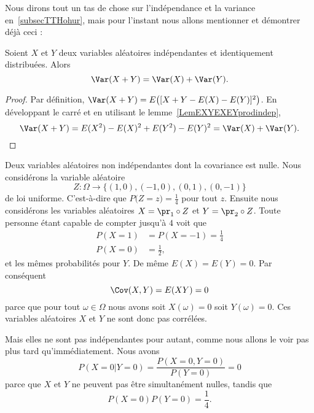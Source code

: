 Nous dirons tout un tas de chose sur l'indépendance et la variance en~\ref{subsecTTHohur}, mais pour l'instant nous allons mentionner et démontrer déjà ceci :
\begin{lemma}   \label{LemVarXpYsmindep}
	Soient \( X\) et \( Y\) deux variables aléatoires indépendantes et identiquement distribuées. Alors
	\begin{equation}
		\Var(X+Y)=\Var(X)+\Var(Y).
	\end{equation}
\end{lemma}

\begin{proof}
	Par définition, \( \Var(X+Y)=E\big( [X+Y-E(X)-E(Y)]^2 \big)\). En développant le carré et en utilisant le lemme~\ref{LemEXYEXEYprodindep},
	\begin{equation}
		\Var(X+Y)=E(X^2)-E(X)^2+E(Y^2)-E(Y)^2=\Var(X)+\Var(Y).
	\end{equation}
\end{proof}

\begin{example} \label{ExWLzkuWd}
	Deux variables aléatoires non indépendantes dont la covariance est nulle. Nous considérons la variable aléatoire
	\begin{equation}
		Z\colon \Omega\to \{ (1,0),(-1,0),(0,1),(0,-1) \}
	\end{equation}
	de loi uniforme. C'est-à-dire que \(  P\big( Z=z \big)=\frac{1}{ 4 }  \) pour tout \( z\). Ensuite nous considérons les variables aléatoires \( X=\pr_1\circ Z\) et \( Y=\pr_2\circ Z\). Toute personne étant capable de compter jusqu'à \( 4\) voit que
	\begin{subequations}
		\begin{align}
			P(X=1) & =P(X=-1)=\frac{1}{ 4 } \\
			P(X=0) & =\frac{ 1 }{2},
		\end{align}
	\end{subequations}
	et les mêmes probabilités pour \( Y\). De même \( E(X)=E(Y)=0\). Par conséquent
	\begin{equation}
		\Cov(X,Y)=E(XY)=0
	\end{equation}
	parce que pour tout \( \omega\in \Omega\) nous avons soit \( X(\omega)=0\) soit \( Y(\omega)=0\). Ces variables aléatoires \( X\) et \( Y\) ne sont donc pas corrélées.

	Mais elles ne sont pas indépendantes pour autant, comme nous allons le voir pas plus tard qu'immédiatement. Nous avons
	\begin{equation}
		P(X=0|Y=0)=\frac{ P(X=0,Y=0) }{ P(Y=0) }=0
	\end{equation}
	parce que \( X\) et \( Y\) ne peuvent pas être simultanément nulles, tandis que
	\begin{equation}
		P(X=0)P(Y=0)=\frac{1}{ 4 }.
	\end{equation}
\end{example}

